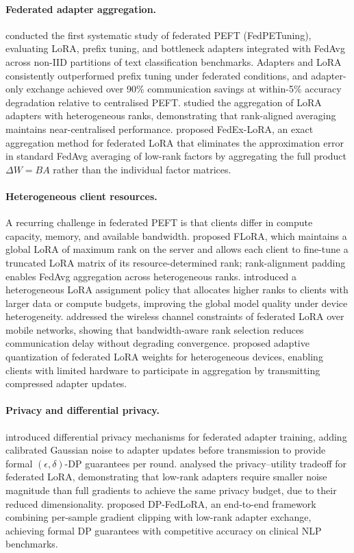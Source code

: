 \paragraph{Federated adapter aggregation.}
\citet{ZhangFedPETuning2023} conducted the first systematic study of federated PEFT
(FedPETuning), evaluating LoRA, prefix tuning, and bottleneck adapters integrated with
FedAvg across non-IID partitions of text classification benchmarks. Adapters and LoRA
consistently outperformed prefix tuning under federated conditions, and adapter-only
exchange achieved over 90\% communication savings at within-5\% accuracy degradation
relative to centralised PEFT. \citet{TrautmannAgg2024} studied the aggregation of LoRA
adapters with heterogeneous ranks, demonstrating that rank-aligned averaging maintains
near-centralised performance. \citet{SinghalFedEx2025} proposed FedEx-LoRA, an exact
aggregation method for federated LoRA that eliminates the approximation error in
standard FedAvg averaging of low-rank factors by aggregating the full product
$\Delta W = BA$ rather than the individual factor matrices.

\paragraph{Heterogeneous client resources.}
A recurring challenge in federated PEFT is that clients differ in compute capacity,
memory, and available bandwidth. \citet{WangFLoRA2024} proposed FLoRA, which maintains
a global LoRA of maximum rank on the server and allows each client to fine-tune a
truncated LoRA matrix of its resource-determined rank; rank-alignment padding enables
FedAvg aggregation across heterogeneous ranks. \citet{ChoHeteroLoRA2024} introduced a
heterogeneous LoRA assignment policy that allocates higher ranks to clients with larger
data or compute budgets, improving the global model quality under device heterogeneity.
\citet{WangGlobecom2024} addressed the wireless channel constraints of federated
LoRA over mobile networks, showing that bandwidth-aware rank selection reduces
communication delay without degrading convergence. \citet{GaoINFOCOM2025} proposed
adaptive quantization of federated LoRA weights for heterogeneous devices, enabling
clients with limited hardware to participate in aggregation by transmitting compressed
adapter updates.

\paragraph{Privacy and differential privacy.}
\citet{LiuDP2023} introduced differential privacy mechanisms for federated adapter
training, adding calibrated Gaussian noise to adapter updates before transmission to
provide formal $(\epsilon, \delta)$-DP guarantees per round. \citet{SunImprovingLoRA2024}
analysed the privacy--utility tradeoff for federated LoRA, demonstrating that low-rank
adapters require smaller noise magnitude than full gradients to achieve the same
privacy budget, due to their reduced dimensionality. \citet{XuDPFedLoRA2025} proposed
DP-FedLoRA, an end-to-end framework combining per-sample gradient clipping with
low-rank adapter exchange, achieving formal DP guarantees with competitive accuracy
on clinical NLP benchmarks.

